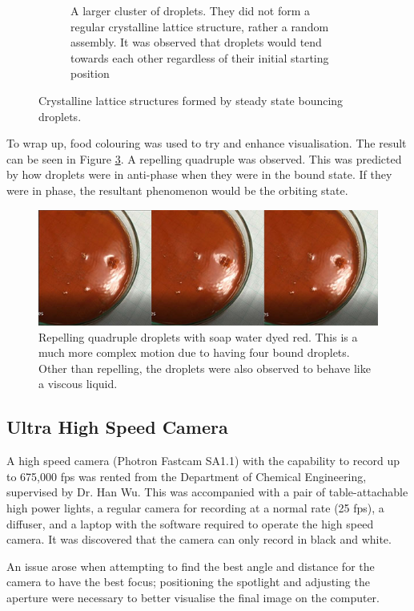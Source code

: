 \begin{figure}[ht]
\begin{subfigure}[t]{0.5\textwidth}
        \caption{A larger cluster of droplets. They did not form a regular crystalline lattice structure, rather a random assembly. It was observed that droplets would tend towards each other regardless of their initial starting position}
        \label{fig:irregular_structure}
    \end{subfigure}
\caption{Crystalline lattice structures formed by steady state bouncing droplets.}
\label{fig:irregular_structure_evolution}
\end{figure}


To wrap up, food colouring was used to try and enhance visualisation. The result can be seen in Figure \ref{fig:red_dye}. A repelling quadruple was observed. This was predicted by how droplets were in anti-phase when they were in the bound state. If they were in phase, the resultant phenomenon would be the orbiting state.

\begin{figure}[ht]
\includegraphics[width=\textwidth]{prototype/exp_rep_imgs/red_dye.jpg}
\centering
\caption{Repelling quadruple droplets with soap water dyed red. This is a much more complex motion due to having four bound droplets. Other than repelling, the droplets were also observed to behave like a viscous liquid.}
\centering
\label{fig:red_dye}
\end{figure}

\subsection{Ultra High Speed Camera}
A high speed camera (Photron Fastcam SA1.1) with the capability to record up to 675,000 fps was rented from the Department of Chemical Engineering, supervised by Dr. Han Wu. This was accompanied with a pair of table-attachable high power  lights, a regular camera for recording at a normal rate (25 fps), a diffuser, and a laptop with the software required to operate the high speed camera. It was discovered that the camera can only record in black and white.

An issue arose when attempting to find the best angle and distance for the camera to have the best focus; positioning the spotlight and adjusting the aperture were necessary to better visualise the final image on the computer.

